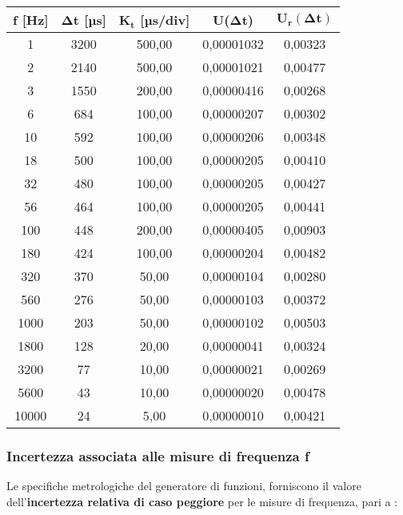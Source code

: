 \begin{table}[!ht]
    \centering
    \begin{tabular}{|c|c|c|c|c|}
    \hline
        \textbf{f [Hz]} & \textbf{$\bm{\Delta t}$ [µs]} & \textbf{$\bm{K_t}$ [µs/div]} & \textbf{U($\bm{\Delta t}$)} & \textbf{$\bm{U_r(\Delta t)}$} \\ \hline
        1 & 3200 & 500,00 & 0,00001032 & 0,00323 \\ \hline
        2 & 2140 & 500,00 & 0,00001021 & 0,00477 \\ \hline
        3 & 1550 & 200,00 & 0,00000416 & 0,00268 \\ \hline
        6 & 684 & 100,00 & 0,00000207 & 0,00302 \\ \hline
        10 & 592 & 100,00 & 0,00000206 & 0,00348 \\ \hline
        18 & 500 & 100,00 & 0,00000205 & 0,00410 \\ \hline
        32 & 480 & 100,00 & 0,00000205 & 0,00427 \\ \hline
        56 & 464 & 100,00 & 0,00000205 & 0,00441 \\ \hline
        100 & 448 & 200,00 & 0,00000405 & 0,00903 \\ \hline
        180 & 424 & 100,00 & 0,00000204 & 0,00482 \\ \hline
        320 & 370 & 50,00 & 0,00000104 & 0,00280 \\ \hline
        560 & 276 & 50,00 & 0,00000103 & 0,00372 \\ \hline
        1000 & 203 & 50,00 & 0,00000102 & 0,00503 \\ \hline
        1800 & 128 & 20,00 & 0,00000041 & 0,00324 \\ \hline
        3200 & 77 & 10,00 & 0,00000021 & 0,00269 \\ \hline
        5600 & 43 & 10,00 & 0,00000020 & 0,00478 \\ \hline
        10000 & 24 & 5,00 & 0,00000010 & 0,00421 \\ \hline
    \end{tabular}
\end{table}
\FloatBarrier
\clearpage

\subsubsection{Incertezza associata alle misure di frequenza f}
Le specifiche metrologiche del generatore di funzioni, forniscono il valore dell'\textbf{incertezza relativa di caso peggiore} per le misure di frequenza, pari a :

